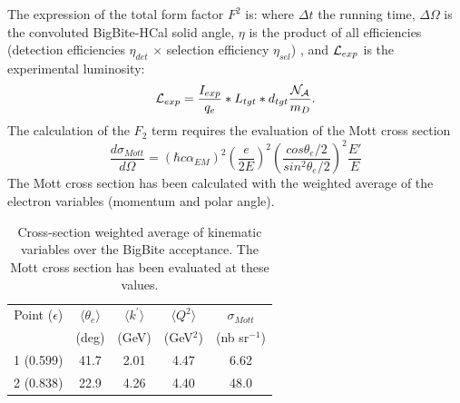 The expression of the total form factor $F^2$ is: 
where $\Delta t$ the running time, $\Delta\Omega$ is the convoluted BigBite-HCal solid angle, $\eta$ is the product of all efficiencies (detection efficiencies $\eta_{det}$ $\times$ selection efficiency $\eta_{sel}$)
, and ${\cal{L}}_{exp}$ is the experimental luminosity:
%
\begin{equation}
  {\cal{L}}_{exp} = \frac{I_{exp}}{q_e}*L_{tgt}*d_{tgt}\frac{\cal{N}_A}{m_{D}}.
\end{equation}
%
The calculation of the $F_2$ term requires the evaluation of the Mott cross section
%
\begin{equation}
  \frac{d\sigma_{Mott}}{d\Omega} = (\hbar c\alpha_{EM})^2 \left( \frac{e}{2E} \right)^2 \left( \frac{cos{\theta_e/2}}{sin^2{\theta_e/2}} \right)^2 \frac{E'}{E}
\end{equation}
%
The Mott cross section has been calculated with the weighted average of the electron variables (momentum and polar angle).
%
\begin{center}
\begin{table}[h]
\begin{tabular}{|c|c|c|c|c|}
\hline
Point ($\epsilon$) & $\langle \theta_e \rangle$ &  $\langle k^{\prime} \rangle$ & $\langle Q^2 \rangle$ & $\sigma_{Mott}$ \\
 & (deg) & (GeV) & (GeV$^2$) & (nb sr$^{-1}$) \\
\hline
1 (0.599) & 41.7 & 2.01 & 4.47 & 6.62 \\ 
\hline
2 (0.838) & 22.9 & 4.26 & 4.40 & 48.0 \\
\hline
\end{tabular} 
\caption{Cross-section weighted average of kinematic variables over the BigBite acceptance. The Mott cross section has been evaluated at these values.}
\label{tab:sigma_mott}
\end{table}
\end{center}
%

